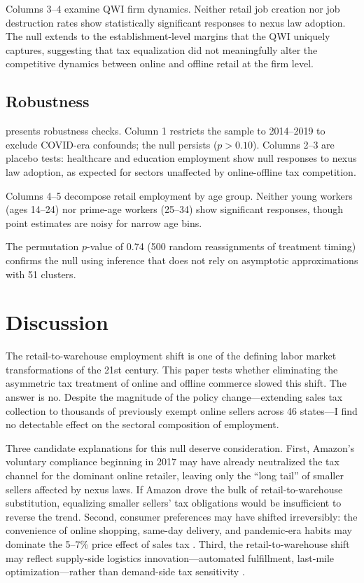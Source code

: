 \documentclass[12pt]{article}
\begin{document}
Columns 3--4 examine QWI firm dynamics. Neither retail job creation nor job destruction rates show statistically significant responses to nexus law adoption. The null extends to the establishment-level margins that the QWI uniquely captures, suggesting that tax equalization did not meaningfully alter the competitive dynamics between online and offline retail at the firm level.

\subsection{Robustness}



 presents robustness checks. Column 1 restricts the sample to 2014--2019 to exclude COVID-era confounds; the null persists ($p > 0.10$). Columns 2--3 are placebo tests: healthcare and education employment show null responses to nexus law adoption, as expected for sectors unaffected by online-offline tax competition.

Columns 4--5 decompose retail employment by age group. Neither young workers (ages 14--24) nor prime-age workers (25--34) show significant responses, though point estimates are noisy for narrow age bins.

The permutation $p$-value of 0.74 (500 random reassignments of treatment timing) confirms the null using inference that does not rely on asymptotic approximations with 51 clusters.


\section{Discussion}
\label{sec:discussion}

The retail-to-warehouse employment shift is one of the defining labor market transformations of the 21st century. This paper tests whether eliminating the asymmetric tax treatment of online and offline commerce slowed this shift. The answer is no. Despite the magnitude of the policy change---extending sales tax collection to thousands of previously exempt online sellers across 46 states---I find no detectable effect on the sectoral composition of employment.

Three candidate explanations for this null deserve consideration. First, Amazon's voluntary compliance beginning in 2017 may have already neutralized the tax channel for the dominant online retailer, leaving only the ``long tail'' of smaller sellers affected by nexus laws. If Amazon drove the bulk of retail-to-warehouse substitution, equalizing smaller sellers' tax obligations would be insufficient to reverse the trend. Second, consumer preferences may have shifted irreversibly: the convenience of online shopping, same-day delivery, and pandemic-era habits may dominate the 5--7\% price effect of sales tax \citep{einav2014}. Third, the retail-to-warehouse shift may reflect supply-side logistics innovation---automated fulfillment, last-mile optimization---rather than demand-side tax sensitivity \citep{syverson2011}.
\end{document}
